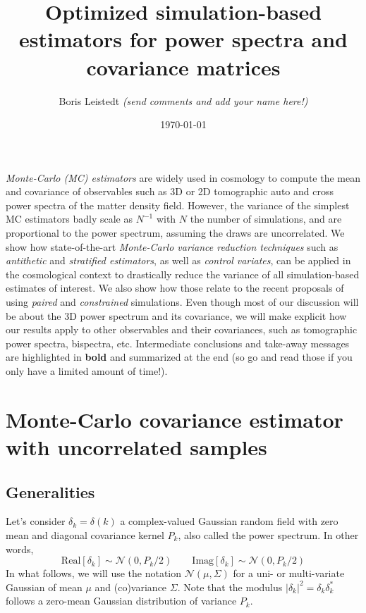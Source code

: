 \documentclass{aastex6}
\newcommand{\equ}[1]{\begin{equation}#1\end{equation}}
\begin{document}
 
\title{Optimized simulation-based estimators for power spectra and covariance matrices} 
\author{Boris Leistedt \textit{(send comments and add your name here!)}}
\date{\today}
\maketitle

\vspace*{-3mm}




\textit{Monte-Carlo (MC) estimators} are widely used in cosmology to compute the mean and covariance of observables such as 3D or 2D tomographic auto and cross power spectra of the matter density field.
However, the variance of the simplest MC estimators badly scale as $N^{-1}$ with $N$ the number of simulations, and are proportional to the power spectrum, assuming the draws are uncorrelated.
We show how state-of-the-art \textit{Monte-Carlo variance reduction techniques} such as \textit{antithetic} and \textit{stratified estimators}, as well as \textit{control variates}, can be applied in the cosmological context to drastically reduce the variance of all simulation-based estimates of interest.
We also show how those relate to the recent proposals of using  \textit{paired} and \textit{constrained} simulations.
Even though most of our discussion will be about the 3D power spectrum and its covariance, we will make explicit how our results apply to other observables and their covariances, such as tomographic power spectra, bispectra, etc.
Intermediate conclusions and take-away messages are highlighted in \textbf{bold} and summarized at the end (so go and read those if you only have a limited amount of time!).

\section{Monte-Carlo covariance estimator with uncorrelated samples}

\subsection{Generalities}

Let's consider $\delta_k = \delta(k)$ a complex-valued Gaussian random field with zero mean and diagonal covariance kernel $P_{k}$, also called the power spectrum. In other words,
\equ{
	\mathrm{Real}[\delta_k] \sim \mathcal{N}(0, P_k/2) \quad \quad \mathrm{Imag}[\delta_k] \sim \mathcal{N}(0, P_k/2) \label{eq:p_delta}
}
In what follows, we will use the notation $\mathcal{N}(\mu, \Sigma)$ for a uni- or multi-variate Gaussian of mean $\mu$ and (co)variance $\Sigma$.
Note that the modulus $|\delta_k|^2 = \delta_k \delta_k^*$ follows a zero-mean Gaussian distribution of variance $P_k$.
\end{document}
